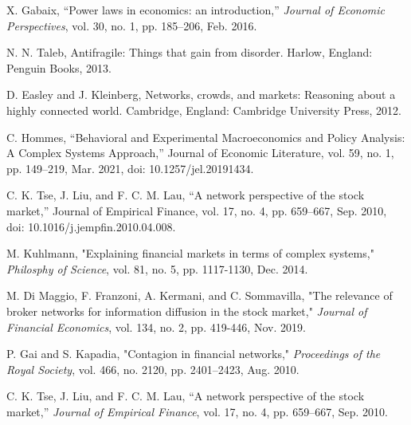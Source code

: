 \documentclass[letterpaper, 10 pt, proceedings]{ieeetran}
\begin{document}
	
	\begin{thebibliography}{99}	
		X. Gabaix, “Power laws in economics: an introduction,” \textit{Journal of Economic Perspectives}, vol. 30, no. 1, pp. 185–206, Feb. 2016.
		
		N. N. Taleb, Antifragile: Things that gain from disorder. Harlow, England: Penguin Books, 2013.
		
		D. Easley and J. Kleinberg, Networks, crowds, and markets: Reasoning about a highly connected world. Cambridge, England: Cambridge University Press, 2012.
		
	
		C. Hommes, “Behavioral and Experimental Macroeconomics and Policy Analysis: A Complex Systems Approach,” Journal of Economic Literature, vol. 59, no. 1, pp. 149–219, Mar. 2021, doi: 10.1257/jel.20191434.
		
		C. K. Tse, J. Liu, and F. C. M. Lau, “A network perspective of the stock market,” Journal of Empirical Finance, vol. 17, no. 4, pp. 659–667, Sep. 2010, doi: 10.1016/j.jempfin.2010.04.008.
		
		M. Kuhlmann, "Explaining financial markets in terms of complex systems," \textit{Philosphy of Science}, vol. 81, no. 5, pp. 1117-1130, Dec. 2014. %
		
		M. Di Maggio, F. Franzoni, A. Kermani, and C. Sommavilla, "The relevance of broker networks for information diffusion in the stock market," \textit{Journal of Financial Economics}, vol. 134, no. 2, pp. 419-446, Nov. 2019. %
		
		
		P. Gai and S. Kapadia, "Contagion in financial networks," \textit{Proceedings of the Royal Society}, vol. 466, no. 2120, pp. 2401–2423, Aug. 2010.
		
		C. K. Tse, J. Liu, and F. C. M. Lau, “A network perspective of the stock market,” \textit{Journal of Empirical Finance}, vol. 17, no. 4, pp. 659–667, Sep. 2010. %
		

\end{thebibliography}
\end{document}
